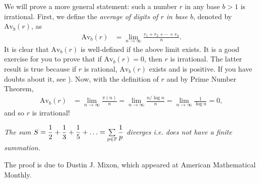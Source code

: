 \begin{solution}
	We will prove a more general statement: such a number $r$ in any base $b>1$ is irrational. First, we define the \textit{average of digits of $r$ in base $b$}, denoted by $\text{Av}_b(r)$, as
	\begin{align*}
	\text{Av}_b(r) &= \lim_{n\to \infty} \frac{r_1+r_2+\cdots+r_n}{n}.
	\end{align*}
	It is clear that $\text{Av}_b(r)$ is well-defined if the above limit exists. It is a good exercise for you to prove that if $\text{Av}_b(r)=0$, then $r$ is irrational. The latter result is true because if $r$ is rational, $\text{Av}_b(r)$ exists and is positive. If you have doubts about it, see \cite{ch:primes-nasehpour}). Now, with the definition of $r$ and by Prime Number Theorem,
	\begin{align*}
	\text{Av}_b(r) &= \lim_{n\to \infty} \frac{\pi(n)}{n} =  \lim_{n\to \infty} \frac{n/\log n}{n} =  \lim_{n\to \infty} \frac{1}{\log n} = 0,
	\end{align*}
	and so $r$ is irrational!
\end{solution}
	\begin{theorem}[Euler]\sl
		The sum $S=\dfrac{1}{2}+\dfrac{1}{3}+\dfrac{1}{5}+\ldots=\sum\limits_{p\in\P }\dfrac{1}{p}$ diverges i.e. does not have a finite summation.
	\end{theorem}
The proof is due to Dustin J. Mixon, which appeared at American Mathematical Monthly\cite{dustin}.
